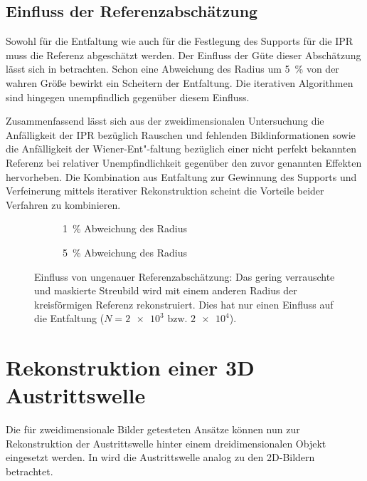 \subsection{Einfluss der Referenzabschätzung}
Sowohl für die Entfaltung wie auch für die Festlegung des Supports für die IPR muss die Referenz abgeschätzt werden. Der Einfluss der Güte dieser Abschätzung lässt sich in  betrachten. Schon eine Abweichung des Radius um 5~\% von der wahren Größe bewirkt ein Scheitern der Entfaltung. Die iterativen Algorithmen sind hingegen unempfindlich gegenüber diesem Einfluss.

Zusammenfassend lässt sich aus der zweidimensionalen Untersuchung die Anfälligkeit der IPR bezüglich Rauschen und fehlenden Bildinformationen sowie die Anfälligkeit der Wiener-Ent"-faltung bezüglich einer nicht perfekt bekannten Referenz bei relativer Unempfindlichkeit gegenüber den zuvor genannten Effekten hervorheben. Die Kombination aus Entfaltung zur Gewinnung des Supports und Verfeinerung mittels iterativer Rekonstruktion scheint die Vorteile beider Verfahren zu kombinieren.
\begin{figure}
	\begin{subfigure}[b]{0.45\textwidth}
		\caption{1~\% Abweichung des Radius}
	\end{subfigure}
	\hspace*{\fill}
	\begin{subfigure}[b]{0.45\textwidth}
		\caption{5~\% Abweichung des Radius}	
	\end{subfigure}
	\caption[2D Rekonstruktion: Einfluss ungenauer Referenzabschätzung]{Einfluss von ungenauer Referenzabschätzung: Das gering verrauschte und maskierte Streubild wird mit einem anderen Radius der kreisförmigen Referenz rekonstruiert. Dies hat nur einen Einfluss auf die Entfaltung ($N=\num{2e3} \text{ bzw. }\num{2e4}$).}
	\label{fig:recon2d-ref}
\end{figure}
 \clearpage
\section{Rekonstruktion einer 3D Austrittswelle}
Die für zweidimensionale Bilder getesteten Ansätze können nun zur Rekonstruktion der Austrittswelle hinter einem dreidimensionalen Objekt eingesetzt werden. In  wird die Austrittswelle analog zu den 2D-Bildern betrachtet.
	
